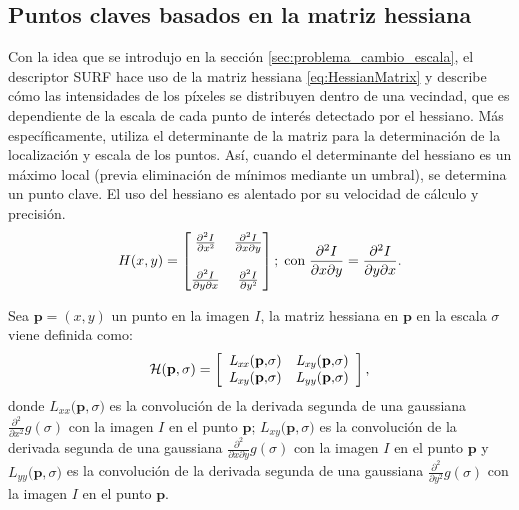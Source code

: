   \subsection{Puntos claves basados en la matriz hessiana}
      \label{sec:matHessiana}
      Con la idea que se introdujo en la sección \ref{sec:problema_cambio_escala}, el descriptor SURF hace uso de la matriz hessiana \eqref{eq:HessianMatrix} y describe cómo las intensidades de los píxeles se distribuyen dentro de una vecindad, que es dependiente de la escala de cada punto de interés detectado por el hessiano. Más específicamente, utiliza el determinante de la matriz para la determinación de la localización y escala de los puntos. Así, cuando el determinante del hessiano es un máximo local (previa eliminación de mínimos mediante un umbral), se determina un punto clave. El uso del hessiano es alentado por su velocidad de cálculo y precisión.%
      \begin{equation}
	H(x,y)=\begin{bmatrix}\frac{\partial^{2}I}{\partial x\text{\texttwosuperior}} & \frac{\partial^{2}I}{\partial x\partial y}\\
	& \\
	\frac{\partial^{2}I}{\partial y\partial x} & \frac{\partial^{2}I}{\partial y\text{\texttwosuperior}}
	\end{bmatrix};\; \textrm{con}\; \frac{\partial^{2}I}{\partial x\partial y}=\frac{\partial^{2}I}{\partial y\partial x}.
	\label{eq:HessianMatrix}
      \end{equation}

      Sea $\mathbf{p}=(x,y)$ un punto en la imagen $\mathit{I}$, la matriz hessiana en $\mathbf{p}$ en la escala $\sigma$ viene definida como:
      \begin{equation}
      \mathcal{H}(\mathbf{p},\sigma)=\left[\begin{array}{cc}
      \mathit{L_{xx}(\mathbf{p},}\sigma)\hphantom{} & \mathit{L_{xy}(\mathbf{p},}\sigma)\\
      \mathit{L_{xy}(\mathbf{p},}\sigma)\hphantom{} & \mathit{L_{yy}(\mathbf{p},}\sigma)
      \end{array}\right],
      \end{equation}
      donde $\mathit{L_{xx}(\mathbf{p},}\sigma)$ es la convolución de la derivada segunda de una gaussiana $\frac{\partial^{2}}{\partial x^{2}}\mathit{g}(\sigma)$ con la imagen $\mathit{I}$ en el punto $\mathbf{p}$; $\mathit{L_{xy}(\mathbf{p},}\sigma)$ es la convolución de la derivada segunda de una gaussiana $\frac{\partial^{2}}{\partial x \partial y}\mathit{g}(\sigma)$ con la imagen $\mathit{I}$ en el punto $\mathbf{p}$ y $\mathit{L_{yy}(\mathbf{p},}\sigma)$ es la convolución de la derivada segunda de una gaussiana $\frac{\partial^{2}}{\partial y^{2}}\mathit{g}(\sigma)$ con la imagen $\mathit{I}$ en el punto $\mathbf{p}$.

